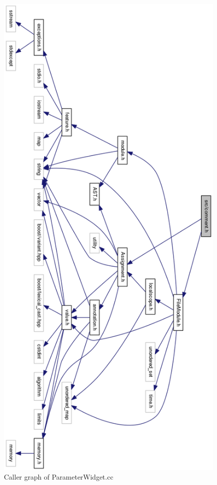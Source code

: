 \begin{figure}
\centering
\includegraphics[width=\linewidth,height=1.35\columnwidth]{images/comment1}
\caption{Caller graph of ParameterWidget.cc}
\label{fig:comment1}
\end{figure}




